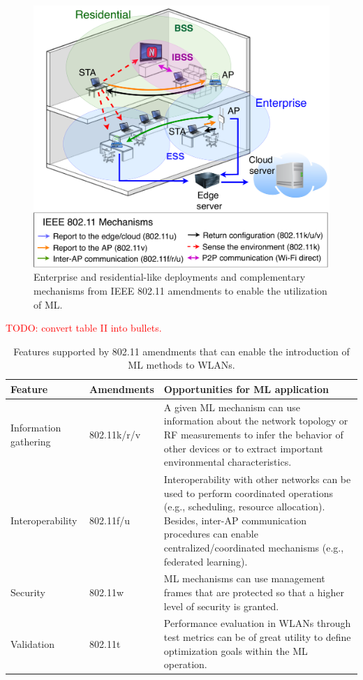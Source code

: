 \documentclass[journal]{IEEEtran}
\begin{document}
\begin{figure}[ht!]
	\centering
	\includegraphics[width=\columnwidth]{overview_learning_approaches}
	\caption{Enterprise and residential-like deployments and complementary mechanisms from IEEE 802.11 amendments to enable the utilization of ML.}
	\label{fig:overview_learning_approaches}
\end{figure}

\textcolor{red}{TODO: convert table II into bullets.}

\begin{table}[t!]
	\caption{Features supported by 802.11 amendments that can enable the introduction of ML methods to WLANs.}
	\label{tab:opportunities_amendments}
	\centering
	\begin{tabular}{|p{}|p{}|p{}|}
		\hline
		\textbf{Feature} & \textbf{Amendments} & \textbf{Opportunities for ML application} \\\hline
		Information gathering & 802.11k/r/v & A given ML mechanism can use information about the network topology or RF measurements to infer the behavior of other devices or to extract important environmental characteristics.\\\hline
		Interoperability & 802.11f/u & Interoperability with other networks can be used to perform coordinated operations (e.g., scheduling, resource allocation). Besides, inter-AP communication procedures can enable centralized/coordinated mechanisms (e.g., federated learning). \\\hline
		Security & 802.11w & ML mechanisms can use management frames that are protected so that a higher level of security is granted.\\\hline
		Validation & 802.11t & Performance evaluation in WLANs through test metrics can be of great utility to define optimization goals within the ML  operation.\\\hline
	\end{tabular}
\end{table}
\end{document}

